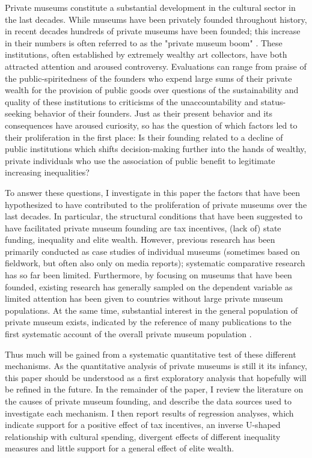 \documentclass[11pt, authoryear]{elsarticle}
\begin{document}
Private museums constitute a substantial development in the cultural sector in the last decades.
While museums have been privately founded throughout history, in recent decades hundreds of private museums have been founded; this increase in their numbers is often referred to as the "private museum boom" \citep{Walker_2019_collector}. 
These institutions, often established by extremely wealthy art collectors, have both attracted attention and aroused controversy.
Evaluations can range from praise of the public-spiritedness of the founders who expend large sums of their private wealth for the provision of public goods over questions of the sustainability and quality of these institutions to criticisms of the unaccountability and status-seeking behavior of their founders. 
Just as their present behavior and its consequences have aroused curiosity, so has the question of which factors led to their proliferation in the first place:
Is their founding related to a decline of public institutions which shifts decision-making further into the hands of wealthy, private individuals who use the association of public benefit to legitimate increasing inequalities?



To answer these questions, I investigate in this paper the factors that have been hypothesized to have contributed to the proliferation of private museums over the last decades.
In particular, the structural conditions that have been suggested to have facilitated private museum founding are tax incentives, (lack of) state funding, inequality and elite wealth.
However, previous research has been primarily conducted as case studies of individual museums (sometimes based on fieldwork, but often also only on media reports); systematic comparative research has so far been limited.
Furthermore, by focusing on museums that have been founded, existing research has generally sampled on the dependent variable as limited attention has been given to countries without large private museum populations.
At the same time, substantial interest in the general population of private museum exists, indicated by the reference of many publications to the first systematic account of the overall private museum population \citep{LarrysList_2015_report}. 

Thus much will be gained from a systematic quantitative test of these different mechanisms.
As the quantitative analysis of private museums is still it its infancy, this paper should be understood as a first exploratory analysis that hopefully will be refined in the future. 
In the remainder of the paper, I review the literature on the causes of private museum founding, and describe the data sources used to investigate each mechanism.
I then report results of regression analyses, which indicate support for a positive effect of tax incentives, an inverse U-shaped relationship with cultural spending, divergent effects of different inequality measures and little support for a general effect of elite wealth.
\end{document}
